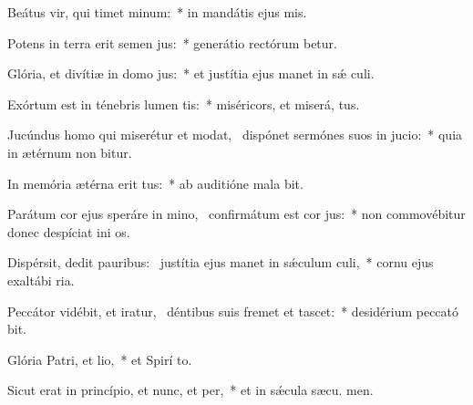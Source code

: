 \item Beátus vir, qui timet minum:~* in mandátis ejus  mis.
\item Potens in terra erit semen jus:~* generátio rectórum betur.
\item Glória, et divítiæ in domo jus:~* et justítia ejus manet in sǽ culi.
\item Exórtum est in ténebris lumen tis:~* miséricors, et miserá,  tus.
\item Jucúndus homo qui miserétur et modat,~\pscross{} dispónet sermónes suos in jucio:~* quia in ætérnum non bitur.
\item In memória ætérna erit tus:~* ab auditióne mala  bit.
\item Parátum cor ejus speráre in mino,~\pscross{} confirmátum est cor jus:~* non commovébitur donec despíciat ini os.
\item Dispérsit, dedit pauribus:~\pscross{} justítia ejus manet in sǽculum culi,~* cornu ejus exaltábi  ria.
\item Peccátor vidébit, et iratur,~\pscross{} déntibus suis fremet et tascet:~* desidérium peccató bit.
\item Glória Patri, et lio,~* et Spirí to.
\item Sicut erat in princípio, et nunc, et per,~* et in sǽcula sæcu. men.

